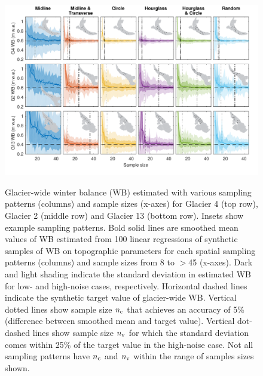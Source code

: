 \documentclass[twocolumn,letterpaper]{igs}
\begin{document}
\begin{figure}
	\centering
	\includegraphics[width =\textwidth]{SyntheticObsWB.pdf}\\
	\caption{Glacier-wide winter balance (WB) estimated with various sampling patterns (columns) and sample sizes (x-axes) for Glacier 4 (top row), Glacier 2 (middle row) and Glacier 13 (bottom row). Insets show example sampling patterns. Bold solid lines are smoothed mean values of WB estimated from 100 linear regressions of synthetic samples of WB on topographic parameters for each spatial sampling patterns (columns) and sample sizes from 8 to $>$45 (x-axes). Dark and light shading indicate the standard deviation in estimated WB for low- and high-noise cases, respectively. Horizontal dashed lines indicate the synthetic target value of glacier-wide WB. Vertical dotted lines show sample size $n_{\rm c}$ that achieves an accuracy of 5\% (difference between smoothed mean and target value). Vertical dot-dashed lines show sample size $n_{\rm v}$ for which the standard deviation comes within 25\% of the target value in the high-noise case. Not all sampling patterns have $n_{\rm c}$ and $n_{\rm v}$ within the range of samples sizes shown.}
	\label{fig:SyntheticObsWB}
\end{figure}
\end{document}
